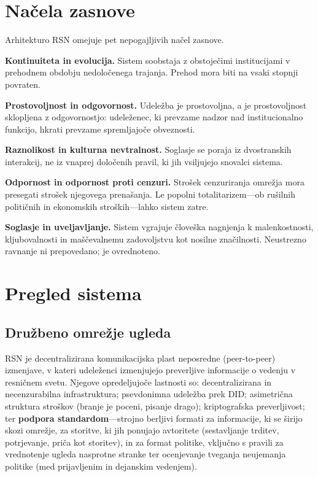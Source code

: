 \documentclass[11pt,a4paper,twocolumn]{article}
\begin{document}
\section{Načela zasnove}

Arhitekturo RSN omejuje pet nepogajljivih načel zasnove.

\textbf{Kontinuiteta in evolucija.} Sistem soobstaja z obstoječimi institucijami v prehodnem obdobju nedoločenega trajanja. Prehod mora biti na vsaki stopnji povraten.

\textbf{Prostovoljnost in odgovornost.} Udeležba je prostovoljna, a je prostovoljnost sklopljena z odgovornostjo: udeleženec, ki prevzame nadzor nad institucionalno funkcijo, hkrati prevzame spremljajoče obveznosti.

\textbf{Raznolikost in kulturna nevtralnost.} Soglasje se poraja iz dvostranskih interakcij, ne iz vnaprej določenih pravil, ki jih vsiljujejo snovalci sistema.

\textbf{Odpornost in odpornost proti cenzuri.} Strošek cenzuriranja omrežja mora presegati strošek njegovega prenašanja. Le popolni totalitarizem---ob rušilnih političnih in ekonomskih stroških---lahko sistem zatre.

\textbf{Soglasje in uveljavljanje.} Sistem vgrajuje človeška nagnjenja k malenkostnosti, kljubovalnosti in maščevalnemu zadovoljstvu kot nosilne značilnosti. Neustrezno ravnanje ni prepovedano; je ovrednoteno.

\section{Pregled sistema}

\subsection{Družbeno omrežje ugleda}

RSN je decentralizirana komunikacijska plast neposredne (peer-to-peer) izmenjave, v kateri udeleženci izmenjujejo preverljive informacije o vedenju v resničnem svetu. Njegove opredeljujoče lastnosti so: decentralizirana in necenzurabilna infrastruktura; psevdonimna udeležba prek DID; asimetrična struktura stroškov (branje je poceni, pisanje drago); kriptografska preverljivost; ter \textbf{podpora standardom}---strojno berljivi formati za informacije, ki se širijo skozi omrežje, za storitve, ki jih ponujajo avtoritete (sestavljanje trditev, potrjevanje, priča kot storitev), in za format politike, vključno s pravili za vrednotenje ugleda nasprotne stranke ter ocenjevanje tveganja neujemanja politike (med prijavljenim in dejanskim vedenjem).
\end{document}
